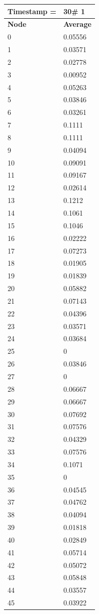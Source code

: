\begin{tabular}{|l||l|}
\hline
\textbf{Timestamp =} & \textbf{30}\# 1\\\hline
	\textbf{Node} & \textbf{Average} \\ \hline
\hline
	0 & 0.05556 \\ \hline
	1 & 0.03571 \\ \hline
	2 & 0.02778 \\ \hline
	3 & 0.00952 \\ \hline
	4 & 0.05263 \\ \hline
	5 & 0.03846 \\ \hline
	6 & 0.03261 \\ \hline
	7 & 0.1111 \\ \hline
	8 & 0.1111 \\ \hline
	9 & 0.04094 \\ \hline
	10 & 0.09091 \\ \hline
	11 & 0.09167 \\ \hline
	12 & 0.02614 \\ \hline
	13 & 0.1212 \\ \hline
	14 & 0.1061 \\ \hline
	15 & 0.1046 \\ \hline
	16 & 0.02222 \\ \hline
	17 & 0.07273 \\ \hline
	18 & 0.01905 \\ \hline
	19 & 0.01839 \\ \hline
	20 & 0.05882 \\ \hline
	21 & 0.07143 \\ \hline
	22 & 0.04396 \\ \hline
	23 & 0.03571 \\ \hline
	24 & 0.03684 \\ \hline
	25 & 0 \\ \hline
	26 & 0.03846 \\ \hline
	27 & 0 \\ \hline
	28 & 0.06667 \\ \hline
	29 & 0.06667 \\ \hline
	30 & 0.07692 \\ \hline
	31 & 0.07576 \\ \hline
	32 & 0.04329 \\ \hline
	33 & 0.07576 \\ \hline
	34 & 0.1071 \\ \hline
	35 & 0 \\ \hline
	36 & 0.04545 \\ \hline
	37 & 0.04762 \\ \hline
	38 & 0.04094 \\ \hline
	39 & 0.01818 \\ \hline
	40 & 0.02849 \\ \hline
	41 & 0.05714 \\ \hline
	42 & 0.05072 \\ \hline
	43 & 0.05848 \\ \hline
	44 & 0.03557 \\ \hline
	45 & 0.03922 \\ \hline
\end{tabular}
